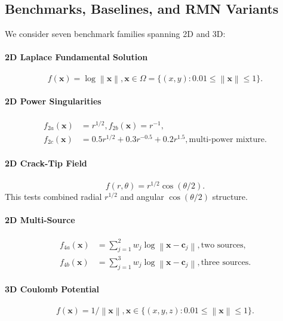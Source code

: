 \documentclass[twoside,11pt]{article}
\newcommand{\bx}{\bm{x}}
\newcommand{\bc}{\bm{c}}
\newcommand{\norm}[1]{\left\|#1\right\|}
\begin{document}
\subsection{Benchmarks, Baselines, and RMN Variants}
\label{subsec:benchmarks}

We consider seven benchmark families spanning 2D and 3D:

\paragraph{2D Laplace Fundamental Solution}
\begin{equation}
	f(\bx) = \log\norm{\bx}, \bx \in \Omega = \{(x, y) : 0.01 \leq \norm{\bx} \leq 1\}.
\end{equation}

\paragraph{2D Power Singularities}
\begin{align}
	f_{2a}(\bx) & = r^{1/2}, f_{2b}(\bx) = r^{-1},                                        \\
	f_{2c}(\bx) & = 0.5 r^{1/2} + 0.3 r^{-0.5} + 0.2 r^{1.5}, \text{multi-power mixture}.
\end{align}

\paragraph{2D Crack-Tip Field}
\begin{equation}
	f(r, \theta) = r^{1/2} \cos(\theta/2).
\end{equation}
This tests combined radial $r^{1/2}$ and angular $\cos(\theta/2)$ structure.

\paragraph{2D Multi-Source}
\begin{align}
	f_{4a}(\bx) & = \sum_{j=1}^2 w_j \log\norm{\bx - \bc_j}, \text{two sources},   \\
	f_{4b}(\bx) & = \sum_{j=1}^3 w_j \log\norm{\bx - \bc_j}, \text{three sources}.
\end{align}

\paragraph{3D Coulomb Potential}
\begin{equation}
	f(\bx) = 1/\norm{\bx}, \bx \in \{(x, y, z) : 0.01 \leq \norm{\bx} \leq 1\}.
\end{equation}
\end{document}
